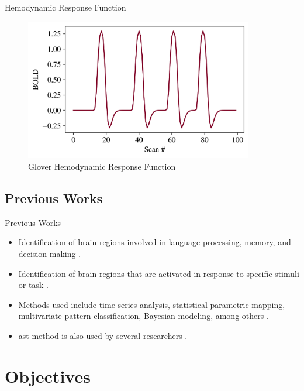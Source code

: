 \documentclass{beamer}
\begin{document}
\begin{frame}{Hemodynamic Response Function}
\begin{figure}
\centering
\includegraphics[width=0.89\textwidth]{images/gloverHRF.png}
\caption{Glover Hemodynamic Response Function}
\end{figure}
\end{frame}

\subsection{Previous Works}

\begin{frame}{Previous Works}
\begin{itemize}
\item Identification of brain regions involved in language processing, memory, and 
decision-making \cite{gaillard2003developmental,golby2005memory,heekeren2003fmri}.
\item Identification of brain regions that are activated in response to specific 
stimuli or task \cite{orchard2003simultaneous, deneux2006using, ardekani1999activation}.
\item Methods used include time-series analysis, statistical parametric mapping, 
multivariate pattern classification, Bayesian modeling, among others 
\cite{adrian2018complex, marchini2004comparing, mumford2012deconvolving, makni2008fully}.
\item \acrfull{ast} method is also used by several researchers 
\cite{tabelow2006analyzing, lindquist2010adaptive, strappini2017adaptive,almodovar2019fast}.
\end{itemize}

\end{frame}

\section{Objectives}
\end{document}
